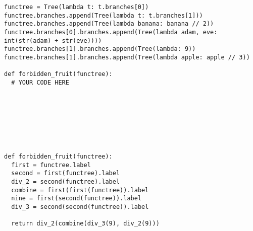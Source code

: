 \documentclass{exam}
\begin{document}
\begin{questions}
\begin{blocksection}
\begin{lstlisting}
functree = Tree(lambda t: t.branches[0])
functree.branches.append(Tree(lambda t: t.branches[1]))
functree.branches.append(Tree(lambda banana: banana // 2))
functree.branches[0].branches.append(Tree(lambda adam, eve: int(str(adam) + str(eve))))
functree.branches[1].branches.append(Tree(lambda: 9))
functree.branches[1].branches.append(Tree(lambda apple: apple // 3))

def forbidden_fruit(functree):
  # YOUR CODE HERE








\end{lstlisting}

\begin{solution}
\begin{lstlisting}
def forbidden_fruit(functree):
  first = functree.label
  second = first(functree).label
  div_2 = second(functree).label
  combine = first(first(functree)).label
  nine = first(second(functree)).label
  div_3 = second(second(functree)).label

  return div_2(combine(div_3(9), div_2(9)))
\end{lstlisting}    
\end{solution}
\end{blocksection}



\end{questions}
\end{document}
